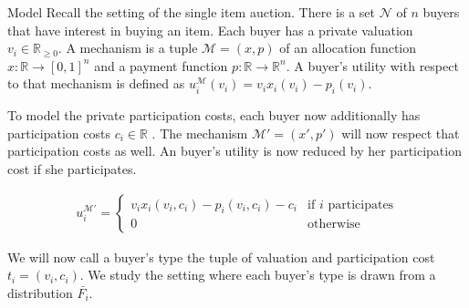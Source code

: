 \documentclass[11pt,a4paper]{article}
\newcommand{\RR}{\ensuremath{\mathbb{R}}}
\newcommand{\1}[1]{\mbox{\rm\bf 1}_{#1}}
\begin{document}
\begin{section}{Model}
 \label{sec:model}
 Recall the setting of the single item auction.
 There is a set $\mathcal{N}$ of $n$ buyers that have interest in buying an item.
 Each buyer has a private valuation $v_i \in \RR_{\geq 0}$.
 A mechanism is a tuple $\mathcal{M} = (x,p)$ of an allocation function $x: \RR \rightarrow [0,1]^n$ and a payment function $p: \RR \rightarrow \RR^n$.
 A buyer's utility with respect to that mechanism is defined as $u_i^\mathcal{M}(v_i) = v_i x_i(v_i) - p_i(v_i)$.

 To model the private participation costs, each buyer now additionally has participation costs $c_i \in \RR$ \cite{primary}.
 The mechanism $\mathcal{M}' = (x', p')$ will now respect that participation costs as well.
 An buyer's utility is now reduced by her participation cost if she participates.

 \begin{align*}
     u_i^{\mathcal{M}'} = \begin{cases}
                              v_i x_i(v_i, c_i) - p_i(v_i, c_i) - c_i & \text{if $i$ participates} \\
                              0                                       & \text{otherwise}
                          \end{cases}
 \end{align*}

 We will now call a buyer's type the tuple of valuation and participation cost $t_i = (v_i, c_i)$.
 We study the setting where each buyer's type is drawn from a distribution $\bar{F_i}$.
\end{section}
\end{document}
